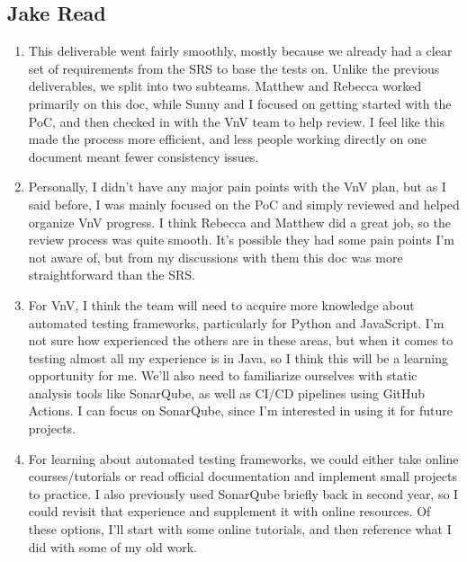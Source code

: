\documentclass[12pt, titlepage]{article}
\begin{document}
\subsection*{Jake Read}
\begin{enumerate}
    \item This deliverable went fairly smoothly, mostly because we already had a clear set of requirements from the SRS to base the tests on.
    Unlike the previous deliverables, we split into two subteams.
    Matthew and Rebecca worked primarily on this doc, while Sunny and I focused on getting started with the PoC, and then checked in with the VnV team to help review.
    I feel like this made the process more efficient, and less people working directly on one document meant fewer consistency issues.
    \item Personally, I didn't have any major pain points with the VnV plan, but as I said before, I was mainly focused on the PoC and simply reviewed and helped organize VnV progress.
    I think Rebecca and Matthew did a great job, so the review process was quite smooth.
    It's possible they had some pain points I'm not aware of, but from my discussions with them this doc was more straightforward than the SRS.
    \item For VnV, I think the team will need to acquire more knowledge about automated testing frameworks, particularly for Python and JavaScript.
    I'm not sure how experienced the others are in these areas, but when it comes to testing almost all my experience is in Java, so I think this will be a learning opportunity for me.
    We'll also need to familiarize ourselves with static analysis tools like SonarQube, as well as CI/CD pipelines using GitHub Actions.
    I can focus on SonarQube, since I'm interested in using it for future projects.
    \item For learning about automated testing frameworks, we could either take online courses/tutorials or read official documentation and implement small projects to practice.
    I also previously used SonarQube briefly back in second year, so I could revisit that experience and supplement it with online resources.
    Of these options, I'll start with some online tutorials, and then reference what I did with some of my old work.
\end{enumerate}
\end{document}
